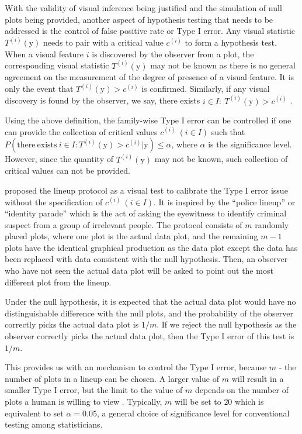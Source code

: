 \documentclass{monashthesis}
\theoremstyle{definition}
\theoremstyle{definition}
\theoremstyle{definition}
\theoremstyle{definition}
\theoremstyle{remark}
\begin{document}
With the validity of visual inference being justified and the simulation of null plots being provided, another aspect of hypothesis testing that needs to be addressed is the control of false positive rate or Type I error. Any visual statistic \(T^{(i)}(\boldsymbol{\mathrm{y}})\) needs to pair with a critical value \(c^{(i)}\) to form a hypothesis test. When a visual feature \(i\) is discovered by the observer from a plot, the corresponding visual statistic \(T^{(i)}(\boldsymbol{\mathrm{y}})\) may not be known as there is no general agreement on the measurement of the degree of presence of a visual feature. It is only the event that \(T^{(i)}(\boldsymbol{\mathrm{y}}) > c^{(i)}\) is confirmed. Similarly, if any visual discovery is found by the observer, we say, there exists \(i \in I:~T^{(i)}(\boldsymbol{\mathrm{y}}) > c^{(i)}\) \autocite{buja_statistical_2009}.

Using the above definition, the family-wise Type I error can be controlled if one can provide the collection of critical values \(c^{(i)}~(i \in I)\) such that \(P(\mathrm{there~exists~} i \in I: T^{(i)}(\boldsymbol{\mathrm{y}}) > c^{(i)}|\boldsymbol{\mathrm{y}}) \leq \alpha\), where \(\alpha\) is the significance level. However, since the quantity of \(T^{(i)}(\boldsymbol{\mathrm{y}})\) may not be known, such collection of critical values can not be provided.

\textcite{buja_statistical_2009} proposed the lineup protocol as a visual test to calibrate the Type I error issue without the specification of \(c^{(i)}~(i \in I)\). It is inspired by the ``police lineup'' or ``identity parade'' which is the act of asking the eyewitness to identify criminal suspect from a group of irrelevant people. The protocol consists of \(m\) randomly placed plots, where one plot is the actual data plot, and the remaining \(m - 1\) plots have the identical graphical production as the data plot except the data has been replaced with data consistent with the null hypothesis. Then, an observer who have not seen the actual data plot will be asked to point out the most different plot from the lineup.

Under the null hypothesis, it is expected that the actual data plot would have no distinguishable difference with the null plots, and the probability of the observer correctly picks the actual data plot is \(1/m\). If we reject the null hypothesis as the observer correctly picks the actual data plot, then the Type I error of this test is \(1/m\).

This provides us with an mechanism to control the Type I error, because \(m\) - the number of plots in a lineup can be chosen. A larger value of \(m\) will result in a smaller Type I error, but the limit to the value of \(m\) depends on the number of plots a human is willing to view \autocite{buja_statistical_2009}. Typically, \(m\) will be set to \(20\) which is equivalent to set \(\alpha = 0.05\), a general choice of significance level for conventional testing among statisticians.
\end{document}
